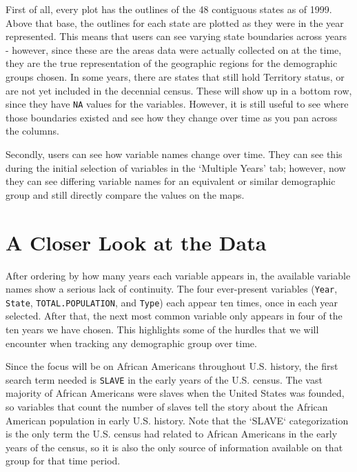 \documentclass[DIV=calc, paper=a4, fontsize=10pt, twocolumn]{scrartcl}\usepackage[]{graphicx}\usepackage[]{color}
\begin{document}
\par First of all, every plot has the outlines of the 48 contiguous states as of 1999. Above that base, the outlines for each state are plotted as they were in the year represented. This means that users can see varying state boundaries across years - however, since these are the areas data were actually collected on at the time, they are the true representation of the geographic regions for the demographic groups chosen. In some years, there are states that still hold Territory status, or are not yet included in the decennial census. These will show up in a bottom row, since they have \texttt{NA} values for the variables. However, it is still useful to see where those boundaries existed and see how they change over time as you pan across the columns.

\par Secondly, users can see how variable names change over time. They can see this during the initial selection of variables in the `Multiple Years' tab; however, now they can see differing variable names for an equivalent or similar demographic group and still directly compare the values on the maps. 

\section*{A Closer Look at the Data}

\par After ordering by how many years each variable appears in, the available variable names show a serious lack of continuity. The four ever-present variables (\texttt{Year}, \texttt{State}, \texttt{TOTAL.POPULATION}, and \texttt{Type}) each appear ten times, once in each year selected. After that, the next most common variable only appears in four of the ten years we have chosen. This highlights some of the hurdles that we will encounter when tracking any demographic group over time. 

\par Since the focus will be on African Americans throughout U.S. history, the first search term needed is \texttt{SLAVE} in the early years of the U.S. census. The vast majority of African Americans were slaves when the United States was founded, so variables that count the number of slaves tell the story about the African American population in early U.S. history. Note that the `SLAVE` categorization is the only term the U.S. census had related to African Americans in the early years of the census, so it is also the only source of information available on that group for that time period.  
\end{document}
